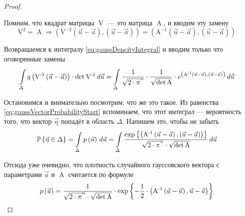 \begin{proof}
\begin{enumerate}
            Помним, что квадрат матрицы $\operatorname{V}$ --- это матрица
            $\operatorname{A}$, и вводим эту замену
            $$\operatorname{V^2} = \operatorname{A} \Rightarrow
                \left( \operatorname{V^{-2}} \left( \vec{u} - \vec{a} \right),
                        \left( \vec{u} - \vec{a} \right) \right)
                = \left( \operatorname{A^{-1}} \left( \vec{u} - \vec{a} \right),
                        \left( \vec{u} - \vec{a} \right) \right)$$
    \end{enumerate}

    Возвращаемся к интегралу \eqref{eq:gaussDencityIntegral} и вводим
    только что оговоренные замены
    $$\integrall{\Delta}{d\vec{u}}{ q\left( \operatorname{V^{-1}}
                \left( \vec{u} - \vec{a} \right) \right)
            \cdot \det{\operatorname{V^{-1}}}}
        = \integrall{\Delta}{d\vec{u}}{\frac{1}{\sqrt{2 \cdot \pi}^n}
            \cdot \frac{1}{\sqrt{\det{\operatorname{A}}}}
            \cdot e^{\left( \operatorname{A^{-1}}
                    \left( \vec{u} - \vec{a} \right),
                \left( \vec{u} - \vec{a} \right) \right)}}$$

    Остановимся и внимательно посмотрим, что же это такое. Из равенства
    \eqref{eq:gaussVectorProbabilityStart} вспоминаем, что этот интеграл ---
    вероятность того, что вектор $\vec{\eta}$ попадёт в область $\Delta$.
    Напишем это, чтобы не забыть
    $$\Probability{\vec{\eta} \in \Delta}
        = \integrall{\Delta}{d\vec{u}}{\pdf{\vec{u}}}
        = \integrall{\Delta}{d\vec{u}}{
            \frac{\exp{\left\{\left( \operatorname{A^{-1}}
                    \left( \vec{u} - \vec{a} \right),
                \left( \vec{u} - \vec{a} \right) \right) \right\}}}{
                \sqrt{2 \cdot \pi}^n \cdot \sqrt{\det{\operatorname{A}}}}}$$

    Отсюда уже очевидно, что плотность случайного гауссовского вектора с
    параметрами $\vec{a}$ и $\operatorname{A}$ считается по формуле
    $$\pdf{\vec{u}}
        = \frac{1}{\sqrt{2 \cdot \pi}^n \cdot \sqrt{\det{\operatorname{A}}}}
            \cdot \exp{\left\{ -\frac{1}{2} \cdot \left(
                \operatorname{A^{-1}} \left( \vec{u} - \vec{a} \right),
                \vec{u} - \vec{a} \right) \right\}}$$
 \end{proof}
